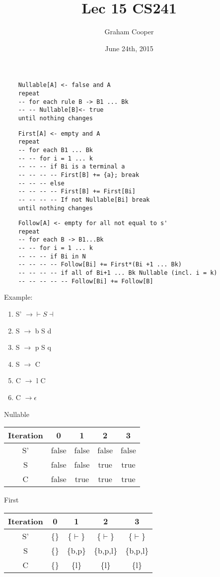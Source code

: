 \documentclass[12pt]{article}
\title{\vspace{-15ex}Lec 15 CS241\vspace{-1ex}}
\date{June 24th, 2015}
\author{Graham Cooper}
\begin{document}
	\maketitle
	
	\begin{verbatim}
	Nullable[A] <- false and A
	repeat
	-- for each rule B -> B1 ... Bk
	-- -- Nullable[B]<- true
	until nothing changes
	\end{verbatim}
	
	\begin{verbatim}
	First[A] <- empty and A
	repeat
	-- for each B1 ... Bk
	-- -- for i = 1 ... k
	-- -- -- if Bi is a terminal a
	-- -- -- -- First[B] += {a}; break
	-- -- -- else
	-- -- -- -- First[B] += First[Bi]
	-- -- -- -- If not Nullable[Bi] break
	until nothing changes
	\end{verbatim}
	
	\begin{verbatim}
	Follow[A] <- empty for all not equal to s'
	repeat
	-- for each B -> B1...Bk
	-- -- for i = 1 ... k
	-- -- -- if Bi in N
	-- -- -- -- Follow[Bi] += First*(Bi +1 ... Bk)
	-- -- -- -- if all of Bi+1 ... Bk Nullable (incl. i = k)
	-- -- -- -- -- Follow[Bi] += Follow[B]
	\end{verbatim}
	
	Example:\\
	\begin{enumerate}
		\item S' $\rightarrow \vdash S \dashv$
		\item S $\rightarrow$ b S d
		\item S $\rightarrow$ p S q
		\item S $\rightarrow$ C
		\item C $\rightarrow$ l C
		\item C $\rightarrow \epsilon$
	\end{enumerate}
	
	Nullable\\
	\begin{tabular}{c | c | c | c | c}
		Iteration & 0 & 1 & 2 & 3\\ \hline
		S' & false & false & false & false\\
		S & false & false & true & true\\
		C & false & true & true & true\\
	\end{tabular}
	
	First\\
	\begin{tabular}{c | c | c | c | c}
		Iteration & 0 & 1 & 2 & 3\\ \hline
		S' & \{\} & \{$\vdash$\}& \{$\vdash$\} & \{$\vdash$\}\\
		S & \{\} & \{b,p\}& \{b,p,l\} & \{b,p,l\}\\
		C & \{\} & \{l\} & \{l\} & \{l\} \\
	\end{tabular}
	
\end{document}
